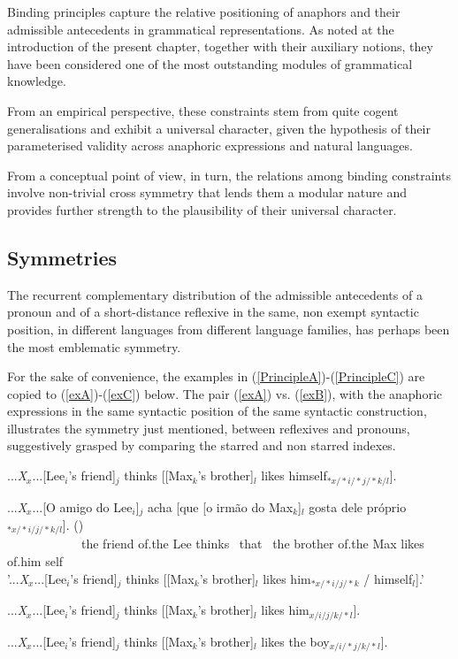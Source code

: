 \documentclass[output=paper
	        ,collection
	        ,collectionchapter
 	        ,biblatex
                ,babelshorthands
                ,newtxmath
                ,draftmode
                ,colorlinks, citecolor=brown
]{langscibook}
\begin{document}
Binding principles capture the relative positioning of anaphors and their 
admissible antecedents in grammatical representations. As noted at the introduction of the present chapter, together with their auxiliary notions, they have been considered one of the most outstanding modules 
of grammatical knowledge.

From an empirical perspective, these constraints stem from quite cogent generalisations and exhibit a universal
character, given the hypothesis of their parameterised validity across anaphoric expressions and natural languages.

From a conceptual point of view, in turn, the relations among binding
constraints involve non-trivial cross symmetry that lends them a modular nature
and provides further strength to the plausibility of their universal character.

\subsection{Symmetries}

The recurrent complementary distribution of the admissible antecedents
of a pronoun and of a short-distance reflexive in the same, non exempt
syntactic position, in different languages from different language families,
has perhaps been the most emblematic symmetry. 

For the sake of convenience,
the examples in (\ref{PrincipleA})-(\ref{PrincipleC}) are copied
to (\ref{exA})-(\ref{exC}) below. The pair (\ref{exA}) vs. (\ref{exB}), with the anaphoric expressions
in the same syntactic position of the same syntactic construction, illustrates
the symmetry just mentioned, between reflexives and pronouns, suggestively grasped by comparing the starred 
and non starred indexes.


\begin{exe}
\ex
\label{exA}
{...{\em X}$_{x}$...[Lee$_{i}$'s friend]$_{j}$ thinks
[[Max$_{k}$'s brother]$_{l}$ likes %
himself$_{*x/*i/*j/*k/l}$].}

\ex
\label{exZ}
\gll ...{\em X}$_{x}$...[O amigo do Lee$_{i}$]$_{j}$ acha [que [o
irm\~{a}o do Max$_{k}$]$_{l}$ gosta dele pr\'{o}prio$_{*x/*i/j/*k/l}$]. ()\\ \mbox{ }\mbox{ }\mbox{ }\mbox{ }\mbox{ }\mbox{ }\mbox{ }\mbox{ }\mbox{ }\mbox{ }\mbox{ }\mbox{ }the friend of.the Lee thinks \mbox{ }that \mbox{ }the brother of.the Max likes of.him self\\
\trans '...{\em X}$_{x}$...[Lee$_{i}$'s friend]$_{j}$ thinks [[Max$_{k}$'s brother]$_{l}$
likes him$_{*x/*i/j/*k}$ / \linebreak
himself$_{l}$].'

\ex
\label{exB}
{...{\em X}$_{x}$...[Lee$_{i}$'s friend]$_{j}$ thinks [[Max$_{k}$'s brother]$_{l}$
likes %
 him$_{x/i/j/k/*l}$].}

\ex
\label{exC}
{...{\em X}$_{x}$...[Lee$_{i}$'s friend]$_{j}$ thinks [[Max$_{k}$'s brother]$_{l}$
likes %
the boy$_{x/i/*j/k/*l}$].}
\end{exe}
\end{document}
